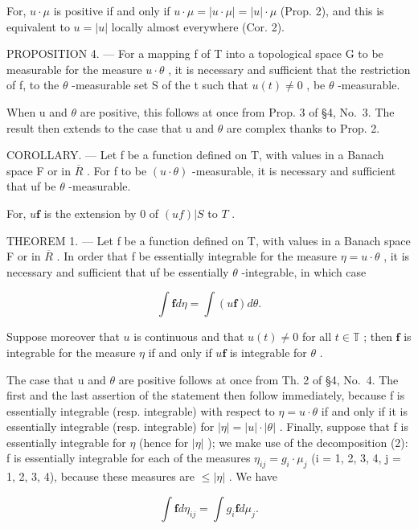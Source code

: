 For, \(u \cdot \mu\) is positive if and only if \(u \cdot \mu = |u \cdot \mu| = |u| \cdot \mu\) (Prop. 2), and this is equivalent to \(u = |u|\) locally almost everywhere (Cor. 2).

PROPOSITION 4. --- For a mapping f of T into a topological space G to be measurable for the measure \(u \cdot \theta\) , it is necessary and sufficient that the restriction of f, to the \(\theta\) -measurable set S of the t such that \(u(t) \neq 0\) , be \(\theta\) -measurable.

When u and \(\theta\) are positive, this follows at once from Prop. 3 of §4, No.~3. The result then extends to the case that u and \(\theta\) are complex thanks to Prop. 2.

COROLLARY. --- Let f be a function defined on T, with values in a Banach space F or in \(\overline{R}\) . For f to be \((u\cdot\theta)\) -measurable, it is necessary and sufficient that uf be \(\theta\) -measurable.

For, \(u\mathbf{f}\) is the extension by 0 of \((uf)|S\) to \(T\) .

THEOREM 1. --- Let f be a function defined on T, with values in a Banach space F or in \(\overline{R}\) . In order that f be essentially integrable for the measure \(\eta = u\cdot \theta\) , it is necessary and sufficient that uf be essentially \(\theta\) -integrable, in which case

\[
\int \mathbf {f} d \eta = \int (u \mathbf {f}) d \theta .\tag{6}
\]

Suppose moreover that \(u\) is continuous and that \(u(t) \neq 0\) for all \(t \in \mathbb{T}\) ; then \(\mathbf{f}\) is integrable for the measure \(\eta\) if and only if \(u\mathbf{f}\) is integrable for \(\theta\) .

The case that u and \(\theta\) are positive follows at once from Th. 2 of §4, No.~4. The first and the last assertion of the statement then follow immediately, because f is essentially integrable (resp. integrable) with respect to \(\eta = u \cdot \theta\) if and only if it is essentially integrable (resp. integrable) for \(|\eta| = |u| \cdot |\theta|\) . Finally, suppose that f is essentially integrable for \(\eta\) (hence for \(|\eta|\) ); we make use of the decomposition (2): f is essentially integrable for each of the measures \(\eta_{ij} = g_i \cdot \mu_j\) (i = 1, 2, 3, 4, j = 1, 2, 3, 4), because these measures are \(\leqslant |\eta|\) . We have

\[
\int \mathbf {f} d \eta_ {i j} = \int g _ {i} \mathbf {f} d \mu_ {j}.
\]

